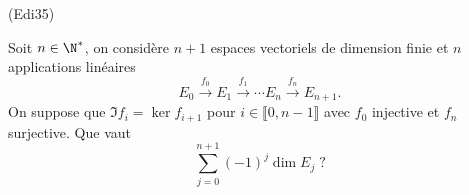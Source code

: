 \begin{tiny}(Edi35)\end{tiny} Soit $n\in \N^*$, on considère $n+1$ espaces vectoriels de dimension finie et $n$ applications linéaires
\begin{displaymath}
  E_0 \xrightarrow{f_0} E_1 \xrightarrow{f_1} \cdots E_n \xrightarrow{f_n} E_{n+1}.
\end{displaymath}
On suppose que $\Im f_i = \ker f_{i+1}$ pour $i\in \llbracket 0,n-1\rrbracket$ avec $f_0$ injective et $f_n$ surjective. Que vaut
\begin{displaymath}
  \sum_{j=0}^{n+1}(-1)^j \dim E_j \;?
\end{displaymath}
